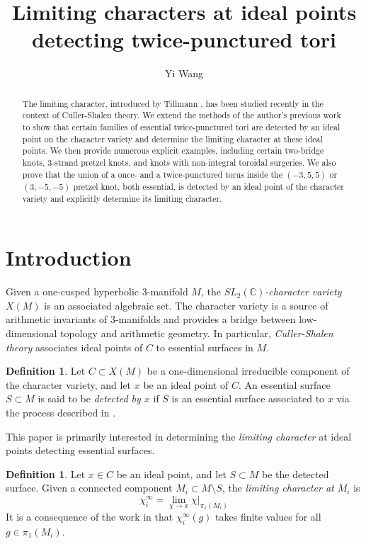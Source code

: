 \documentclass{article}
\title{Limiting characters at ideal points detecting twice-punctured tori}
\author{Yi Wang}
\date{}
\theoremstyle{plain}
\theoremstyle{definition}
\newtheorem{definition}[theorem]{Definition}
\theoremstyle{plain}
\theoremstyle{plain}
\theoremstyle{plain}
\theoremstyle{remark}
\theoremstyle{remark}
\theoremstyle{plain}
\theoremstyle{plain}
\begin{document}
\maketitle

\begin{abstract}
The limiting character, introduced by Tillmann \cite{tillmann}, has been studied recently in the context of Culler-Shalen theory. We extend the methods of the author's previous work \cite{Wang} to show that certain families of essential twice-punctured tori are detected by an ideal point on the character variety and determine the limiting character at these ideal points. We then provide numerous explicit examples, including certain two-bridge knots, 3-strand pretzel knots, and knots with non-integral toroidal surgeries. We also prove that the union of a once- and a twice-punctured torus inside the $(-3, 5, 5)$ or $(3, -5, -5)$ pretzel knot, both essential, is detected by an ideal point of the character variety and explicitly determine its limiting character. 
\end{abstract}

\section{Introduction}\label{sec:intro}

Given a one-cusped hyperbolic 3-manifold $M$, the \emph{$SL_2(\mathbb{C})$-character variety} $X(M)$ is an associated algebraic set. The character variety is a source of arithmetic invariants of 3-manifolds and provides a bridge between low-dimensional topology and arithmetic geometry. In particular, \emph{Culler-Shalen theory} \cite{Culler1983VarietiesOG} associates ideal points of $C$ to essential surfaces in $M$.

\begin{definition}
Let $C \subset X(M)$ be a one-dimensional irreducible component of the character variety, and let $x$ be an ideal point of $C$. An essential surface $S \subset M$ is said to be \emph{detected by $x$} if $S$ is an essential surface associated to $x$ via the process described in \cite{Culler1983VarietiesOG}. 
\end{definition}

This paper is primarily interested in determining the \emph{limiting character} at ideal points detecting essential surfaces. 

\begin{definition}
Let $x \in C$ be an ideal point, and let $S \subset M$ be the detected surface. Given a connected component $M_i \subset M \setminus S$, the \emph{limiting character at $M_i$} is 
\begin{equation}
	\chi_i^\infty = \lim_{\chi \to x}\chi|_{\pi_1(M_i)}
\end{equation}
It is a consequence of the work in \cite{Culler1983VarietiesOG} that $\chi_i^\infty(g)$ takes finite values for all $g \in \pi_1(M_i)$. 
\end{definition}
\end{document}
